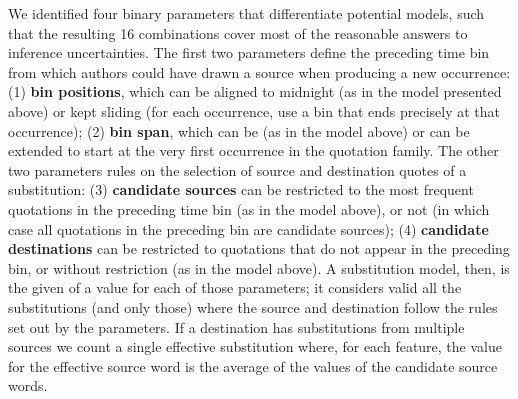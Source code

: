 \begin{new}

We identified four binary parameters that differentiate potential models, such that the resulting 16 combinations cover most of the reasonable answers to inference uncertainties.
The first two parameters define the preceding time bin from which authors could have drawn a source when producing a new occurrence:
(1) \textbf{bin positions}, which can be aligned to midnight (as in the model presented above) or kept sliding (for each occurrence, use a bin that ends precisely at that occurrence);
(2) \textbf{bin span}, which can be  %
(as in the model above) or can be extended to start at the very first occurrence in the quotation family.
The other two parameters  rules on the selection of source and destination quotes of a substitution:
(3) \textbf{candidate sources} can be restricted to the most frequent quotations in the preceding time bin (as in the model above), or not (in which case all quotations in the preceding bin are candidate sources);
(4) \textbf{candidate destinations} can be restricted to quotations that do not appear in the preceding bin, or without restriction (as in the model above).
A substitution model, then, is the given of a value for each of those parameters;
it considers valid all the substitutions (and only those) where the source and destination follow the rules set out by the parameters.
If a destination has substitutions from multiple sources we count a single effective substitution where, for each feature, the value for the effective source word is the average of the values of the candidate source words.

\end{new}
